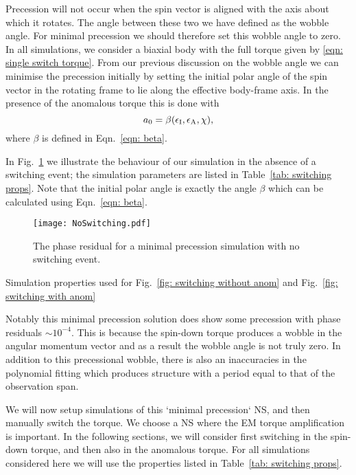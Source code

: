 \documentclass[../full_thesis/full_thesis.tex]{subfiles}
\newcommand{\thisdir}{../inertial_frame}
\begin{document}
Precession will not occur when the spin vector is aligned with the axis about
which it rotates. The angle between these two we have defined as the wobble
angle.  For minimal precession we should therefore set this wobble angle to
zero. In all simulations, we consider a biaxial body with the full torque given
by \eqref{eqn: single switch torque}. From our previous discussion on the
wobble angle we can minimise the precession initially by setting the initial polar angle
of the spin vector in the rotating frame to lie along the effective body-frame
axis. In the presence of the anomalous torque this is done with
\begin{equation}
a_{0} = \beta(\epsilon_{\mathrm{I}}, \epsilon_{\mathrm{A}}, \chi),
\end{equation}
where $\beta$ is defined in Eqn.~\ref{eqn: beta}.

In Fig.~\ref{fig: no switching} we illustrate the behaviour of our simulation
in the absence of a switching event; the simulation parameters are listed in
Table~\ref{tab: switching props}. Note that the initial polar angle is
exactly the angle $\beta$ which can be calculated using Eqn.~\eqref{eqn: beta}.
\begin{figure}[htb]
\texttt{[image: NoSwitching.pdf]}
\caption{The phase residual for a minimal precession simulation with no
         switching event.}
\label{fig: no switching}
\end{figure}
\begin{table}[htb]
\centering

\caption{Simulation properties used for Fig.~\ref{fig: switching without anom}
and Fig.~\ref{fig: switching with anom}}
\label{tab: switching props}
\end{table}

Notably this minimal precession solution does show some precession with phase
residuals $\sim 10^{-4}$. This is because the spin-down torque produces a wobble
in the angular momentum vector and as a result the wobble angle is not truly
zero. In addition to this precessional wobble, there is also an inaccuracies
in the polynomial fitting which produces structure with a period equal to that
of the observation span.

We will now setup simulations of this `minimal precession` NS, and then
manually switch the torque. We choose a NS where the EM torque amplification is
important.  In the following sections, we will consider first switching in the
spin-down torque, and then also in the anomalous torque. For all simulations
considered here we will use the properties listed in Table~\ref{tab: switching
props}.
\end{document}
